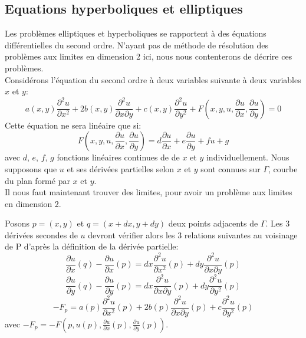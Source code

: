 \documentclass[12pt]{article}
\begin{document}
\subsection{Equations hyperboliques et elliptiques}

Les problèmes elliptiques et hyperboliques se rapportent à des équations différentielles du second ordre. N'ayant pas de méthode de résolution des problèmes aux limites en dimension 2 ici, nous nous contenterons de décrire ces problèmes.\\
Considérons l'équation du second ordre à deux variables suivante à deux variables $x$ et $y$:
\begin{equation}
a(x,y) \frac{\partial^2 u}{\partial x^2} + 2b(x,y) \frac{\partial^2 u}{\partial x \partial y} + c(x,y) \frac{\partial^2 u}{\partial y^2} + F(x,y,u,  \frac{\partial u}{\partial x}, \frac{\partial u}{\partial y}) = 0
\end{equation}
Cette équation ne sera linéaire que si:
\begin{equation}
F(x,y,u,  \frac{\partial u}{\partial x}, \frac{\partial u}{\partial y}) = d\frac{\partial u}{\partial x} + e\frac{\partial u}{\partial y} + fu + g
\end{equation}
avec $d$, $e$, $f$, $g$ fonctions linéaires continues de de $x$ et $y$ individuellement.  Nous supposons que $u$ et ses dérivées partielles selon $x$ et $y$ sont connues sur $\Gamma$, courbe du plan formé par $x$ et $y$.\\
Il nous faut maintenant trouver des limites, pour avoir un problème aux limites en dimension 2.

Posons $p = (x, y)$ et $q = (x+dx, y+dy)$ deux points adjacents de $\Gamma$. Les 3 dérivées secondes de $u$ devront vérifier alors les 3 relations suivantes au voisinage de P d'après la définition de la dérivée partielle:
\begin{equation}
\frac{\partial u}{\partial x}(q) - \frac{\partial u}{\partial x}(p) = dx\frac{\partial^2 u}{\partial x^2}(p) + dy \frac{\partial^2 u}{\partial x \partial y}(p)
\end{equation}
\begin{equation}
\frac{\partial u}{\partial y}(q) - \frac{\partial u}{\partial y}(p) = dx\frac{\partial^2 u}{\partial x \partial y}(p) + dy \frac{\partial^2 u}{\partial y^2}(p)
\end{equation}
\begin{equation}
-F_p = a(p)\frac{\partial^2 u}{\partial x^2}(p) + 2b(p) \frac{\partial^2 u}{\partial x \partial y}(p) + c\frac{\partial^2 u}{\partial y^2}(p)
\end{equation}
avec $-F_p = -F(p, u(p), \frac{\partial u}{\partial x}(p), \frac{\partial u}{\partial y}(p))$.
\end{document}
